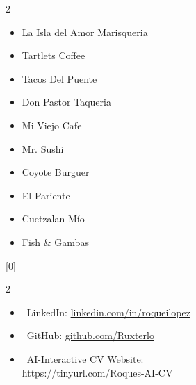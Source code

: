 \documentclass[a4paper,11pt]{article}
\begin{document}
\begin{multicols}{2}
\begin{itemize}
        \item La Isla del Amor Marisqueria \href{https://www.instagram.com/laisla_delamor/}{\faGlobe}
        \item Tartlets Coffee \href{https://www.tarletscoffee.com.mx/}{\faGlobe}
        \item Tacos Del Puente \href{https://www.instagram.com/tacosdelpuentepuebla/}{\faGlobe}
        \item Don Pastor Taqueria \href{https://www.donpastor.mx/}{\faGlobe}
        \item Mi Viejo Cafe \href{https://www.miviejocafe.com.mx/}{\faGlobe}
        \item Mr. Sushi \href{https://www.mrsushi.mx/}{\faGlobe}
        \item Coyote Burguer \href{https://www.facebook.com/p/Coyote-Burguer-100063678456517/}{\faGlobe}
        \item El Pariente \href{https://www.instagram.com/elpariente.restaurante/}{\faGlobe}
        \item Cuetzalan Mío \href{https://cuetzalan-mio.com/}{\faGlobe}
        \item Fish \& Gambas \href{https://www.fishandgambas.com/}{\faGlobe}
        
\end{itemize}
\end{multicols}
\cvsection{}[0]

\begin{multicols}{2}

\begin{itemize}

        \item \faLinkedin\ LinkedIn: \href{https://www.linkedin.com/in/roqueilopez}{linkedin.com/in/roqueilopez}  \\
        \item \faGithub\ GitHub: \href{https://github.com/Ruxterlo}{github.com/Ruxterlo} \\
        \item \faGlobe\ AI-Interactive CV Website: \href{https://tinyurl.com/Roques-AI-CV}\\ {  https://tinyurl.com/Roques-AI-CV} \faMousePointer
\end{itemize}
\columnbreak
        \centering {}
        
\end{multicols}
\end{document}
